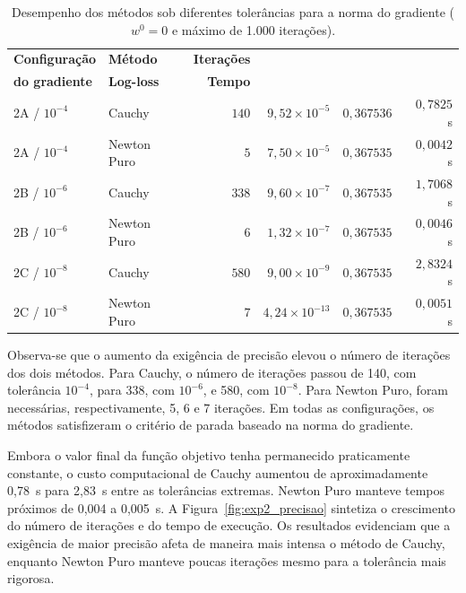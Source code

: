 \documentclass{article}
\theoremstyle{remark}
\begin{document}
\begin{table}[htbp]
\centering
\caption{Desempenho dos métodos sob diferentes tolerâncias para a norma do gradiente ($w^0 = 0$ e máximo de 1.000 iterações).}
\label{tab:exp2_precisao}
\renewcommand{\arraystretch}{1.15}
{\small
\begin{tabularx}{\textwidth}{@{} l X r r r r @{}}
\toprule
\textbf{Configuração} & \textbf{Método} & \textbf{Iterações} & \begin{tabular}[b]{@{}r@{}}\textbf{Norma final}\\\textbf{do gradiente}\end{tabular} & \textbf{Log-loss} & \textbf{Tempo} \\
\midrule
2A / $10^{-4}$ & Cauchy & $140$ & $9{,}52 \times 10^{-5}$ & $0{,}367536$ & $0{,}7825$~s \\
2A / $10^{-4}$ & Newton Puro & $5$ & $7{,}50 \times 10^{-5}$ & $0{,}367535$ & $0{,}0042$~s \\
\addlinespace
2B / $10^{-6}$ & Cauchy & $338$ & $9{,}60 \times 10^{-7}$ & $0{,}367535$ & $1{,}7068$~s \\
2B / $10^{-6}$ & Newton Puro & $6$ & $1{,}32 \times 10^{-7}$ & $0{,}367535$ & $0{,}0046$~s \\
\addlinespace
2C / $10^{-8}$ & Cauchy & $580$ & $9{,}00 \times 10^{-9}$ & $0{,}367535$ & $2{,}8324$~s \\
2C / $10^{-8}$ & Newton Puro & $7$ & $4{,}24 \times 10^{-13}$ & $0{,}367535$ & $0{,}0051$~s \\
\bottomrule
\end{tabularx}
}
\end{table}

Observa-se que o aumento da exigência de precisão elevou o número de iterações dos dois métodos. Para Cauchy, o número de iterações passou de 140, com tolerância $10^{-4}$, para 338, com $10^{-6}$, e 580, com $10^{-8}$. Para Newton Puro, foram necessárias, respectivamente, 5, 6 e 7 iterações. Em todas as configurações, os métodos satisfizeram o critério de parada baseado na norma do gradiente.

Embora o valor final da função objetivo tenha permanecido praticamente constante, o custo computacional de Cauchy aumentou de aproximadamente 0,78~s para 2,83~s entre as tolerâncias extremas. Newton Puro manteve tempos próximos de 0,004 a 0,005~s. A Figura~\ref{fig:exp2_precisao} sintetiza o crescimento do número de iterações e do tempo de execução. Os resultados evidenciam que a exigência de maior precisão afeta de maneira mais intensa o método de Cauchy, enquanto Newton Puro manteve poucas iterações mesmo para a tolerância mais rigorosa.
\end{document}
